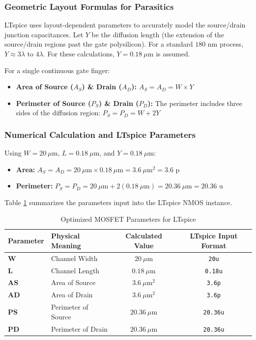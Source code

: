 \documentclass[conference]{IEEEtran}
\begin{document}
\subsubsection{Geometric Layout Formulas for Parasitics}
LTspice uses layout-dependent parameters to accurately model the source/drain junction capacitances. Let $Y$ be the diffusion length (the extension of the source/drain regions past the gate polysilicon). For a standard $180\text{ nm}$ process, $Y \approx 3\lambda$ to $4\lambda$. For these calculations, $Y = 0.18\ \mu\text{m}$ is assumed.

For a single continuous gate finger:
\begin{itemize}
    \item \textbf{Area of Source ($A_S$) \& Drain ($A_D$):} $A_S = A_D = W \times Y$
    \item \textbf{Perimeter of Source ($P_S$) \& Drain ($P_D$):} The perimeter includes three sides of the diffusion region: $P_S = P_D = W + 2Y$
\end{itemize}

\subsubsection{Numerical Calculation and LTspice Parameters}
Using $W = 20\ \mu\text{m}$, $L = 0.18\ \mu\text{m}$, and $Y = 0.18\ \mu\text{m}$:
\begin{itemize}
    \item \textbf{Area:} $A_S = A_D = 20\ \mu\text{m} \times 0.18\ \mu\text{m} = 3.6\ \mu\text{m}^2 = 3.6\text{ p}$
    \item \textbf{Perimeter:} $P_S = P_D = 20\ \mu\text{m} + 2(0.18\ \mu\text{m}) = 20.36\ \mu\text{m} = 20.36\text{ u}$
\end{itemize}

Table \ref{tab:mosfet_params} summarizes the parameters input into the LTspice NMOS instance.

\begin{table}[H]
    \centering
    \caption{Optimized MOSFET Parameters for LTspice}
    \renewcommand{\arraystretch}{1.2}
    \begin{tabular}{@{}llcc@{}}
        \toprule
        \textbf{Parameter} & \textbf{Physical Meaning} & \textbf{Calculated Value} & \textbf{LTspice Input Format} \\ \midrule
        \textbf{W} & Channel Width & $20\ \mu\text{m}$ & \texttt{20u} \\
        \textbf{L} & Channel Length & $0.18\ \mu\text{m}$ & \texttt{0.18u} \\
        \textbf{AS} & Area of Source & $3.6\ \mu\text{m}^2$ & \texttt{3.6p} \\
        \textbf{AD} & Area of Drain & $3.6\ \mu\text{m}^2$ & \texttt{3.6p} \\
        \textbf{PS} & Perimeter of Source & $20.36\ \mu\text{m}$ & \texttt{20.36u} \\
        \textbf{PD} & Perimeter of Drain & $20.36\ \mu\text{m}$ & \texttt{20.36u} \\ \bottomrule
    \end{tabular}
    \label{tab:mosfet_params}
\end{table}
\end{document}

